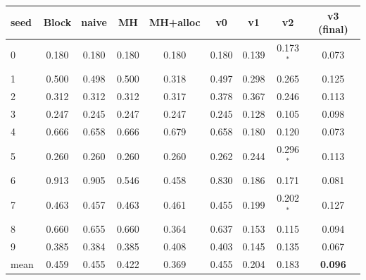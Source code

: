 \begin{tabular}{lcccccccc}
\toprule
seed & Block & naive & MH & MH+alloc & v0 & v1 & v2 & v3 (final) \\
\midrule
0 & 0.180 & 0.180 & 0.180 & 0.180 & 0.180 & 0.139 & 0.173$^{*}$ & 0.073 \\
1 & 0.500 & 0.498 & 0.500 & 0.318 & 0.497 & 0.298 & 0.265 & 0.125 \\
2 & 0.312 & 0.312 & 0.312 & 0.317 & 0.378 & 0.367 & 0.246 & 0.113 \\
3 & 0.247 & 0.245 & 0.247 & 0.247 & 0.245 & 0.128 & 0.105 & 0.098 \\
4 & 0.666 & 0.658 & 0.666 & 0.679 & 0.658 & 0.180 & 0.120 & 0.073 \\
5 & 0.260 & 0.260 & 0.260 & 0.260 & 0.262 & 0.244 & 0.296$^{*}$ & 0.113 \\
6 & 0.913 & 0.905 & 0.546 & 0.458 & 0.830 & 0.186 & 0.171 & 0.081 \\
7 & 0.463 & 0.457 & 0.463 & 0.461 & 0.455 & 0.199 & 0.202$^{*}$ & 0.127 \\
8 & 0.660 & 0.655 & 0.660 & 0.364 & 0.637 & 0.153 & 0.115 & 0.094 \\
9 & 0.385 & 0.384 & 0.385 & 0.408 & 0.403 & 0.145 & 0.135 & 0.067 \\
\midrule
mean & 0.459 & 0.455 & 0.422 & 0.369 & 0.455 & 0.204 & 0.183 & \textbf{0.096} \\
\bottomrule
\end{tabular}